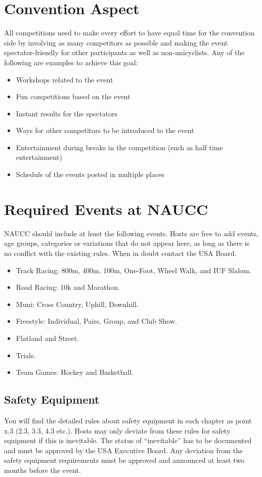 \section{Convention Aspect}
All competitions need to make every effort to have equal time for the convention side by involving as many competitors as possible and making the event spectator-friendly for other participants as well as non-unicyclists.
Any of the following are examples to achieve this goal:
\begin{itemize}
  \item Workshops related to the event
  \item Fun competitions based on the event
  \item Instant results for the spectators
  \item Ways for other competitors to be introduced to the event
  \item Entertainment during breaks in the competition (such as half time entertainment)
  \item Schedule of the events posted in multiple places
\end{itemize}

\section{Required Events at NAUCC}
NAUCC should include at least the following events. 
Hosts are free to add events, age groups, categories or variations that do not appear here, as long as there is no conflict with the existing rules. 
When in doubt contact the USA Board.
\begin{itemize}
  \item Track Racing: 800m, 400m, 100m, One-Foot, Wheel Walk, and IUF Slalom.
  \item Road Racing: 10k and Marathon.
   \item Muni: Cross Country, Uphill, Downhill.
   \item Freestyle: Individual, Pairs, Group, and Club Show.
   \item Flatland and Street.
   \item Trials.
  \item Team Games: Hockey and Basketball.
\end{itemize}

\subsection{Safety Equipment}
You will find the detailed rules about safety equipment in each chapter as point x.3 (2.3, 3.3, 4.3 etc.).
Hosts may only deviate from these rules for safety equipment if this is inevitable. The status of ``inevitable'' has to be documented and must be approved by the USA Executive Board. 
Any deviation from the safety equipment requirements must be approved and announced at least two months before the event.

